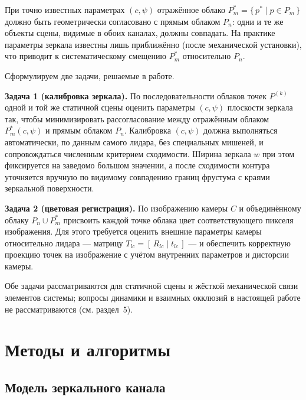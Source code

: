 \documentclass{misisarticle}
\begin{document}
При точно известных параметрах $(c, \psi)$ отражённое облако
$P_m^{*} = \{\, p^{*} \mid p \in P_m \,\}$ должно быть геометрически
согласовано с прямым облаком $P_n$: одни и те же объекты сцены,
видимые в обоих каналах, должны совпадать. На практике параметры
зеркала известны лишь приближённо (после механической установки), что
приводит к систематическому смещению $P_m^{*}$ относительно $P_n$.

Сформулируем две задачи, решаемые в работе.

\textbf{Задача 1 (калибровка зеркала).} По последовательности облаков точек
$P^{(k)}$ одной и той же статичной сцены оценить параметры
$(c, \psi)$ плоскости зеркала так, чтобы минимизировать рассогласование
между отражённым облаком $P_m^{*}(c, \psi)$ и прямым облаком $P_n$.
Калибровка $(c, \psi)$ должна выполняться автоматически, по данным самого лидара,
без специальных мишеней, и сопровождаться численным критерием сходимости.
Ширина зеркала $w$ при этом фиксируется на заведомо большом значении, а после сходимости
контура уточняется вручную по видимому совпадению границ фрустума с краями зеркальной поверхности.

\textbf{Задача 2 (цветовая регистрация).} По изображению камеры $C$ и
объединённому облаку $P_n \cup P_m^{*}$ присвоить каждой точке облака
цвет соответствующего пикселя изображения. Для этого требуется оценить
внешние параметры камеры относительно лидара --- матрицу
$T_{lc} = [\,R_{lc} \mid t_{lc}\,]$ --- и обеспечить корректную
проекцию точек на изображение с учётом внутренних параметров и
дисторсии камеры.

Обе задачи рассматриваются для статичной сцены и жёсткой механической
связи элементов системы; вопросы динамики и взаимных окклюзий в
настоящей работе не рассматриваются (см. раздел~5).

\section{Методы и алгоритмы}

\subsection{Модель зеркального канала}
\label{sec:mirror-model}
\end{document}
